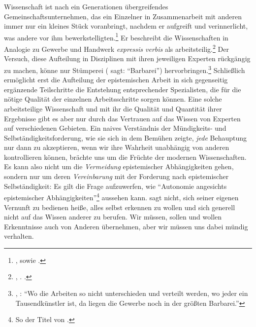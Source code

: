 Wissenschaft ist nach  ein Generationen übergreifendes
Gemeinschaftsunternehmen, das ein Einzelner in Zusammenarbeit mit anderen immer nur ein kleines Stück voranbringt,
nachdem er aufgreift und verinnerlicht, was andere vor ihm
bewerkstelligten.\footnote{\cite[Vgl.][A
388\,f.,]{Kant:IdeezueinerallgemeinenGeschichteinweltbuergerlicherAbsicht1977}
\cite[VIII: 18.29--19.16]{Kant:GesammelteWerke1900ff.}, sowie \cite[A
322\,f.,]{Kant:AnthropologieinpragmatischerHinsicht1977} \cite[VII:
325.30--326.9]{Kant:GesammelteWerke1900ff.}.} Er
beschreibt die Wissenschaften in Analogie zu Gewerbe und Handwerk
\emph{expressis verbis} als
arbeitsteilig.\footnote{\label{Fussnote:EpistemischeArbeitsteilungGMS}\cite[Vgl.][BA
v--vii]{Kant:GrundlegungzurMetaphysikderSitten1965}, \cite[][IV:
388.15--389.4]{Kant:GesammelteWerke1900ff.}.
\cite[Vgl.][67]{Brandt:UniversitaetzwischenSelbst-undFremdbestimmung2003}.} Der
Versuch, diese Aufteilung in Disziplinen mit ihren jeweiligen Experten
rückgängig zu machen, könne nur Stümperei ( sagt: \enquote{Barbarei})
hervorbringen.\footnote{\cite[Vgl.][BA
vi]{Kant:GrundlegungzurMetaphysikderSitten1965}, \cite[][IV:
388.19--21]{Kant:GesammelteWerke1900ff.}: \enquote{Wo die Arbeiten so nicht
unterschieden und verteilt werden, wo jeder ein Tausendkünstler ist, da liegen
die Gewerbe noch in der größten Barbarei.}} Schließlich ermöglicht erst die
Aufteilung der epistemischen Arbeit in sich gegenseitig ergänzende Teilschritte
die Entstehung entsprechender Spezialisten, die für die nötige Qualität der
einzelnen Arbeitsschritte sorgen können. Eine solche
arbeitsteilige Wissenschaft und mit ihr die Qualität und Quantität ihrer
Ergebnisse gibt es aber nur durch das Vertrauen auf das Wissen von
Experten auf verschiedenen Gebieten. Ein naives Verständnis der Mündigkeits- und
Selbständigkeitsforderung, wie sie sich in dem Bemühen zeigte, \emph{jede}
Behauptung nur dann zu akzeptieren, wenn wir ihre Wahrheit unabhängig von
anderen kontrollieren können, brächte uns um die Früchte der modernen
Wissenschaften. Es kann also nicht um die \emph{Vermeidung} epistemischer
Abhängigkeiten gehen, sondern nur um deren \emph{Vereinbarung} mit der Forderung
nach epistemischer Selbständigkeit: Es gilt die Frage aufzuwerfen, wie
\enquote{Autonomie angesichts epistemischer Abhängigkeiten}\footnote{So der
Titel von \cite{Scholz:AutonomieangesichtsepistemischerAbhaengigkeiten2001}.} aussehen
kann.  sagt nicht, sich seiner eigenen Vernunft zu bedienen heiße, alles
selbst erkennen zu wollen und sich generell nicht auf das Wissen anderer zu
berufen. Wir müssen, sollen und wollen Erkenntnisse auch von Anderen übernehmen,
aber wir müssen uns dabei mündig verhalten.

